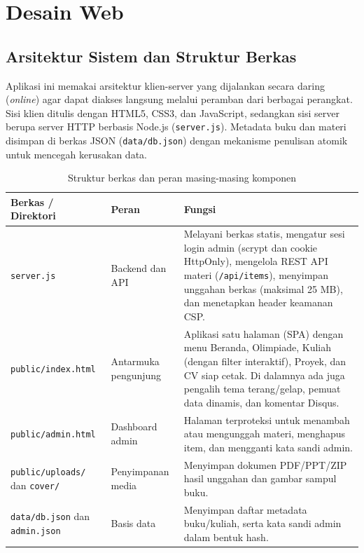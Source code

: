 \documentclass[12pt,a4paper]{article}
\begin{document}
	\section{Desain Web}
	
	\subsection{Arsitektur Sistem dan Struktur Berkas}
	
	Aplikasi ini memakai arsitektur klien-server yang dijalankan secara daring (\textit{online}) agar dapat diakses langsung melalui peramban dari berbagai perangkat. Sisi klien ditulis dengan HTML5, CSS3, dan JavaScript, sedangkan sisi server berupa server HTTP berbasis Node.js (\texttt{server.js}). Metadata buku dan materi disimpan di berkas JSON (\texttt{data/db.json}) dengan mekanisme penulisan atomik untuk mencegah kerusakan data.
	
	\begin{table}[h]
		\centering
		\small
		\begin{tabularx}{\textwidth}{@{}>{\raggedright\arraybackslash}p{3.2cm} p{2.6cm} L@{}}
			\toprule
			\textbf{Berkas / Direktori} & \textbf{Peran} & \textbf{Fungsi} \\
			\midrule
			\texttt{server.js} & Backend dan API & Melayani berkas statis, mengatur sesi login admin (scrypt dan cookie HttpOnly), mengelola REST API materi (\texttt{/api/items}), menyimpan unggahan berkas (maksimal 25 MB), dan menetapkan header keamanan CSP. \\
			\texttt{public/index.html} & Antarmuka pengunjung & Aplikasi satu halaman (SPA) dengan menu Beranda, Olimpiade, Kuliah (dengan filter interaktif), Proyek, dan CV siap cetak. Di dalamnya ada juga pengalih tema terang/gelap, pemuat data dinamis, dan komentar Disqus. \\
			\texttt{public/admin.html} & Dashboard admin & Halaman terproteksi untuk menambah atau mengunggah materi, menghapus item, dan mengganti kata sandi admin. \\
			\texttt{public/uploads/} dan \texttt{cover/} & Penyimpanan media & Menyimpan dokumen PDF/PPT/ZIP hasil unggahan dan gambar sampul buku. \\
			\texttt{data/db.json} dan \texttt{admin.json} & Basis data & Menyimpan daftar metadata buku/kuliah, serta kata sandi admin dalam bentuk hash. \\
			\bottomrule
		\end{tabularx}
		\caption{Struktur berkas dan peran masing-masing komponen}
	\end{table}
	
\end{document}
